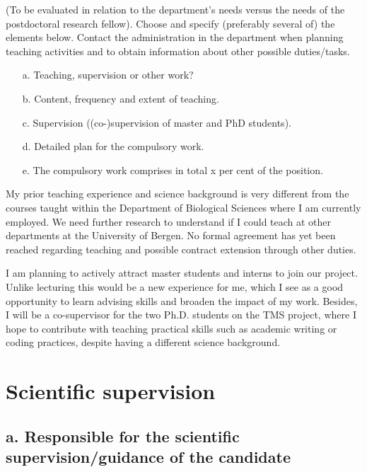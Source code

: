 \documentclass{article}
\newcommand{\guideline}[1]{{\color{color2}\itshape{#1}}}
\begin{document}
    \guideline{
        (To be evaluated in relation to the department’s needs versus the needs
        of the postdoctoral research fellow). Choose and specify (preferably
        several of) the elements below. Contact the administration in the
        department when planning teaching activities and to obtain information
        about other possible duties/tasks.

        \begin{itemize}
          \item[a.] Teaching, supervision or other work?
          \item[b.] Content, frequency and extent of teaching.
          \item[c.] Supervision ((co-)supervision of master and PhD students).
          \item[d.] Detailed plan for the compulsory work.
          \item[e.] The compulsory work comprises in total x per cent of the position.
        \end{itemize}}

    My prior teaching experience and science background is very different from
    the courses taught within the Department of Biological Sciences where I am
    currently employed. We need further research to understand if I could teach
    at other departments at the University of Bergen. No formal agreement has
    yet been reached regarding teaching and possible contract extension through
    other duties.

    I am planning to actively attract master students and interns to join our
    project. Unlike lecturing this would be a new experience for me, which I
    see as a good opportunity to learn advising skills and broaden the impact
    of my work. Besides, I will be a co-supervisor for the two Ph.D. students
    on the TMS project, where I hope to contribute with teaching practical
    skills such as academic writing or coding practices, despite having a
    different science background.

\section{Scientific supervision}

\subsection{a. Responsible for the scientific supervision/guidance of the
            candidate}
\end{document}
